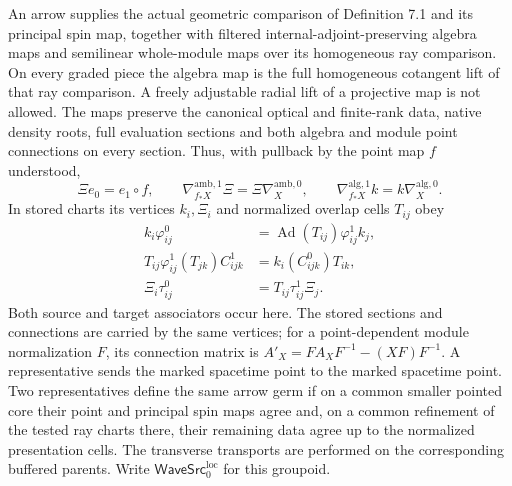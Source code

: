 \documentclass[
  english,
  11pt,
  reqno]{amsart}
\begin{document}
An arrow supplies the actual geometric comparison of Definition 7.1 and
its principal spin map, together with filtered
internal-adjoint-preserving algebra maps and semilinear whole-module
maps over its homogeneous ray comparison. On every graded piece the
algebra map is the full homogeneous cotangent lift of that ray
comparison. A freely adjustable radial lift of a projective map is not
allowed. The maps preserve the canonical optical and finite-rank data,
native density roots, full evaluation sections and both algebra and
module point connections on every section. Thus, with pullback by the
point map \(f\) understood,%
 \[
\Xi e_0=e_1\circ f,\qquad
\nabla^{\mathrm{amb},1}_{f_*X}\Xi=\Xi\nabla^{\mathrm{amb},0}_X,\qquad
\nabla^{\mathrm{alg},1}_{f_*X}k=k\nabla^{\mathrm{alg},0}_X.
\] In stored charts its vertices \(k_i,\Xi_i\) and normalized overlap
cells \(T_{ij}\) obey%
 \[
\begin{aligned}
k_i\varphi^0_{ij}
 &=\operatorname{Ad}(T_{ij})\varphi^1_{ij}k_j,\\
T_{ij}\varphi^1_{ij}(T_{jk})C^1_{ijk}
 &=k_i(C^0_{ijk})T_{ik},\\
\Xi_i\tau^0_{ij}
 &=T_{ij}\tau^1_{ij}\Xi_j.
\end{aligned}
\] Both source and target associators occur here. The stored sections
and connections are carried by the same vertices; for a point-dependent
module normalization \(F\), its connection matrix is
\(A'_X=FA_XF^{-1}-(XF)F^{-1}\). A representative sends the marked
spacetime point to the marked spacetime point. Two representatives
define the same arrow germ if on a common smaller pointed core their
point and principal spin maps agree and, on a common refinement of the
tested ray charts there, their remaining data agree up to the normalized
presentation cells. The transverse transports are performed on the
corresponding buffered parents. Write
\(\mathsf{WaveSrc}^{\mathrm{loc}}_0\) for this groupoid.
\end{document}
